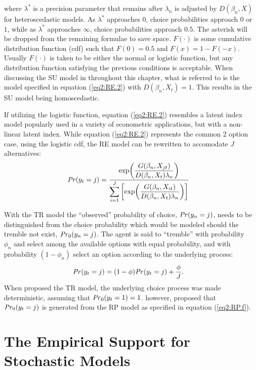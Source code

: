 \documentclass[../main.tex]{subfiles}
\begin{document}
\noindent where $\lambda^*$ is a precision parameter that remains after $\lambda_n$ is adjusted by $D(\beta_n,X)$ for heteroscedastic models.
As $\lambda^*$ approaches $0$, choice probabilities approach $0$ or $1$, while as $\lambda^*$ approaches $\infty$, choice probabilities approach $0.5$.
The asterisk will be dropped from the remaining formulae to save space.
$F(\cdot)$ is some cumulative distribution function (cdf) such that $F(0) = 0.5$ and $F(x) = 1 - F(-x)$.
Usually $F(\cdot)$ is taken to be either the normal or logistic function, but any distribution function satisfying the previous conditions is acceptable.
When discussing the SU model in throughout this chapter, what is referred to is the model specified in equation (\ref{eq2:RE.2}) with $D(\beta_n,X_t) = 1$.
This results in the SU model being homoscedastic.

If utilizing the logistic function, equation (\ref{eq2:RE.2}) resembles a latent index model popularly used in a variety of econometric applications, but with a non-linear latent index.
While equation (\ref{eq2:RE.2}) represents the common 2 option case, using the logistic cdf, the RE model can be rewritten to accomodate $J$ alternatives:
\begin{equation}
	\label{eq2:RE.f}
	{\ensuremath{\mathit{Pr}}}(y_t=j) =\dfrac{\exp\!\left( \dfrac{ G(\beta_n,X_{jt}) }{ D(\beta_n,X_{t})\lambda_n }  \right)}{ \displaystyle\sum_{i=1}^J \left[ \exp\!\left( \dfrac{ G(\beta_n,X_{it}) }{ D(\beta_n,X_{t})\lambda_n }  \right)  \right]  }
\end{equation}

With the TR model the \enquote{observed} probability of choice, ${\mathit{Pr}}(y_n=j)$, needs to be distinguished from the choice probability which would be modeled should the tremble not exist, ${\mathit{Pr}}_0(y_n=j)$.
The agent is said to \enquote{tremble} with probability $\phi_n$ and select among the available options with equal probability, and with probability $(1-\phi_n)$ select an option according to the underlying process:
\begin{equation}
	\label{eq2:TR.f}
	{\ensuremath{\mathit{Pr}}}(y_t=j) = (1-\phi) {\mathit{Pr}}(y_t=j) + \frac{\phi}{J}.
\end{equation}
When \textcite{Harless1994} proposed the TR model, the underlying choice process was made deterministic, assuming that ${\mathit{Pr}}_0(y_t=1) = 1$.
\textcite{Loomes2002} however, proposed that ${\mathit{Pr}}_0(y_t=j)$ is generated from the RP model as specified in equation (\ref{eq2:RP.f}).

\section{The Empirical Support for Stochastic Models}
\end{document}
